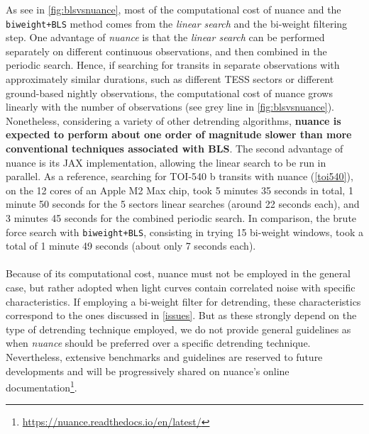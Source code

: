 \documentclass[modern]{aastex631}
\newcommand{\nuancemethod}{\textit{nuance}}
\newcommand{\nuancecode}{\textsf{nuance}}
\newcommand{\footlink}[1]{\footnote{\url{#1}}}
\begin{document}
As see in \autoref{fig:blsvsnuance}, most of the computational cost of \nuancecode{} and the \texttt{biweight+BLS} method comes from the \textit{linear search} and the bi-weight filtering step. One advantage of \nuancemethod{} is that the \textit{linear search} can be performed separately on different continuous observations, and then combined in the periodic search. Hence, if searching for transits in separate observations with approximately similar durations, such as different TESS sectors or different ground-based nightly observations, the computational cost of \nuancecode{} grows linearly with the number of observations (see grey line in \autoref{fig:blsvsnuance}). Nonetheless, considering a variety of other detrending algorithms, \textbf{\nuancecode{} is expected to perform about one order of magnitude slower than more conventional techniques associated with \textsf{BLS}}. The second advantage of \nuancecode{} is its \textsf{JAX} implementation, allowing the linear search to be run in parallel. As a reference, searching for TOI-540 b transits with nuance (\autoref{toi540}), on the 12 cores of an Apple M2 Max chip, took 5 minutes 35 seconds in total, 1 minute 50 seconds for the 5 sectors linear searches (around 22 seconds each), and 3 minutes 45 seconds for the combined periodic search. In comparison, the brute force search with \texttt{biweight+BLS}, consisting in trying 15 bi-weight windows, took a total of 1 minute 49 seconds (about only 7 seconds each).\\\\
Because of its computational cost, \nuancecode{} must not be employed in the general case, but rather adopted when light curves contain correlated noise with specific characteristics. If employing a bi-weight filter for detrending, these characteristics correspond to the ones discussed in \autoref{issues}. But as these strongly depend on the type of detrending technique employed, we do not provide general guidelines as when \nuancemethod{} should be preferred over a specific detrending technique. Nevertheless, extensive benchmarks and guidelines are reserved to future developments and will be progressively shared on \nuancecode{}'s online documentation\footlink{https://nuance.readthedocs.io/en/latest/}.
\end{document}

